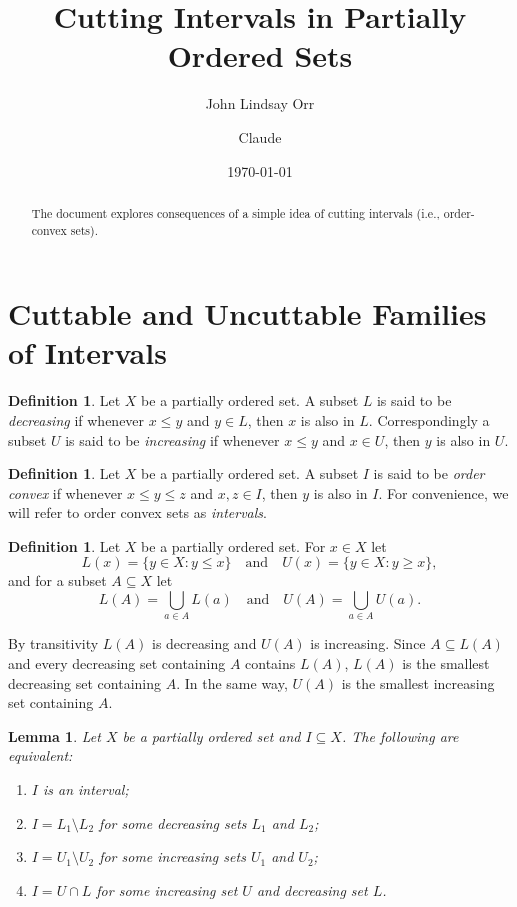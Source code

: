 \documentclass[10pt, a4paper]{article}
\title{Cutting Intervals in Partially Ordered Sets}
\author{John Lindsay Orr \and Claude}
\date{\today}
\theoremstyle{plain}
\newtheorem{lemma}[theorem]{Lemma}
\theoremstyle{definition}
\newtheorem{definition}[theorem]{Definition}
\begin{document}
\maketitle

\begin{abstract}
  The document explores consequences of a simple idea of cutting intervals
  (i.e., order-convex sets).
\end{abstract}

\section{Cuttable and Uncuttable Families of Intervals}

\begin{definition}
  Let $X$ be a partially ordered set. A subset $L$ is said to be \emph{decreasing}
  if whenever $x\le y$ and $y\in L$, then $x$ is also in $L$. Correspondingly a subset
  $U$ is said to be \emph{increasing} if whenever $x\le y$ and $x\in U$, then $y$ is
  also in $U$.
\end{definition}

\begin{definition}
  Let $X$ be a partially ordered set. A subset $I$ is said to be \emph{order convex}
  if whenever $x\le y\le z$ and $x,z\in I$, then $y$ is also in $I$. For convenience,
  we will refer to order convex sets as \emph{intervals}.
\end{definition}

\begin{definition}
  Let $X$ be a partially ordered set. For $x\in X$ let
  \[
    L(x) = \{y\in X : y\le x\} \quad\text{and}\quad U(x) = \{y\in X : y\ge x\},
  \]
  and for a subset $A\subseteq X$ let
  \[
    L(A) = \bigcup_{a\in A} L(a) \quad\text{and}\quad U(A) = \bigcup_{a\in A} U(a).
  \]
\end{definition}

By transitivity $L(A)$ is decreasing and $U(A)$ is increasing. Since $A\subseteq L(A)$
and every decreasing set containing $A$ contains $L(A)$, $L(A)$ is the smallest
decreasing set containing $A$. In the same way, $U(A)$ is the smallest increasing set
containing $A$.

\begin{lemma}\label{lem:interval-difference}
  Let $X$ be a partially ordered set and $I\subseteq X$. The following are equivalent:
  \begin{enumerate}
    \item $I$ is an interval;
    \item $I = L_1\setminus L_2$ for some decreasing sets $L_1$ and $L_2$;
    \item $I = U_1\setminus U_2$ for some increasing sets $U_1$ and $U_2$;
    \item $I = U\cap L$ for some increasing set $U$ and decreasing set $L$.
  \end{enumerate}
\end{lemma}
\end{document}
